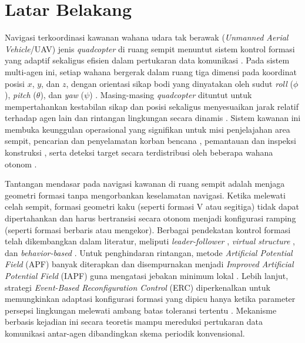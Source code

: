 \documentclass[12pt,a4paper]{report}
\begin{document}
\section{Latar Belakang}
Navigasi terkoordinasi kawanan wahana udara tak berawak (\textit{Unmanned Aerial Vehicle}/UAV\label{abbr:uav}) jenis \textit{quadcopter} di ruang sempit menuntut sistem kontrol formasi yang adaptif sekaligus efisien dalam pertukaran data komunikasi \cite{gettinger3DefiningDrones2024}. Pada sistem multi-agen ini, setiap wahana bergerak dalam ruang tiga dimensi pada koordinat posisi $x$\label{sym:x}, $y$\label{sym:y}, dan $z$\label{sym:z}, dengan orientasi sikap bodi yang dinyatakan oleh sudut \textit{roll} ($\phi$\label{sym:phi}), \textit{pitch} ($\theta$\label{sym:theta}), dan \textit{yaw} ($\psi$\label{sym:psi}) \cite{brescianiniNonlinearQuadrocopterAttitude2013a, johnBobzwikQuadcopter_SimCon2025}. Masing-masing \textit{quadcopter} dituntut untuk mempertahankan kestabilan sikap dan posisi sekaligus menyesuaikan jarak relatif terhadap agen lain dan rintangan lingkungan secara dinamis \cite{kurochkinMethodsFormationControl2021}. Sistem kawanan ini membuka keunggulan operasional yang signifikan untuk misi penjelajahan area sempit, pencarian dan penyelamatan korban bencana \cite{lyuUnmannedAerialVehicles2023}, pemantauan dan inspeksi konstruksi \cite{liangUAVsConstructionAdvancements2023}, serta deteksi target secara terdistribusi oleh beberapa wahana otonom \cite{adoniInvestigationAutonomousMultiUAV2023}.

Tantangan mendasar pada navigasi kawanan di ruang sempit adalah menjaga geometri formasi tanpa mengorbankan keselamatan navigasi. Ketika melewati celah sempit, formasi geometri kaku (seperti formasi V atau segitiga) tidak dapat dipertahankan dan harus bertransisi secara otonom menjadi konfigurasi ramping (seperti formasi berbaris atau mengekor). Berbagai pendekatan kontrol formasi telah dikembangkan dalam literatur, meliputi \textit{leader-follower} \cite{abroComprehensiveReviewNextGen2025}, \textit{virtual structure} \cite{renFormationFeedbackControl2004, moreiraControllingVirtualStructure2024}, dan \textit{behavior-based} \cite{balchBehaviorbasedFormationControl1998}. Untuk penghindaran rintangan, metode \textit{Artificial Potential Field} (APF) banyak diterapkan dan disempurnakan menjadi \textit{Improved Artificial Potential Field} (IAPF) guna mengatasi jebakan minimum lokal \cite{wangUAVFormationObstacle2021, buiEventbasedReconfigurationControl2025}. Lebih lanjut, strategi \textit{Event-Based Reconfiguration Control} (ERC\label{abbr:erc}) diperkenalkan untuk memungkinkan adaptasi konfigurasi formasi yang dipicu hanya ketika parameter persepsi lingkungan melewati ambang batas toleransi tertentu \cite{buiEventbasedReconfigurationControl2025}. Mekanisme berbasis kejadian ini secara teoretis mampu mereduksi pertukaran data komunikasi antar-agen dibandingkan skema periodik konvensional.
\end{document}
